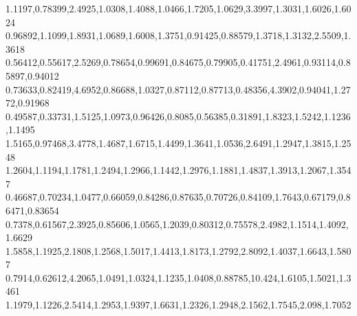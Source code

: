 1.1197,0.78399,2.4925,1.0308,1.4088,1.0466,1.7205,1.0629,3.3997,1.3031,1.6026,1.6024
0.96892,1.1099,1.8931,1.0689,1.6008,1.3751,0.91425,0.88579,1.3718,1.3132,2.5509,1.3618
0.56412,0.55617,2.5269,0.78654,0.99691,0.84675,0.79905,0.41751,2.4961,0.93114,0.85897,0.94012
0.73633,0.82419,4.6952,0.86688,1.0327,0.87112,0.87713,0.48356,4.3902,0.94041,1.2772,0.91968
0.49587,0.33731,1.5125,1.0973,0.96426,0.8085,0.56385,0.31891,1.8323,1.5242,1.1236,1.1495
1.5165,0.97468,3.4778,1.4687,1.6715,1.4499,1.3641,1.0536,2.6491,1.2947,1.3815,1.2548
1.2604,1.1194,1.1781,1.2494,1.2966,1.1442,1.2976,1.1881,1.4837,1.3913,1.2067,1.3547
0.46687,0.70234,1.0477,0.66059,0.84286,0.87635,0.70726,0.84109,1.7643,0.67179,0.86471,0.83654
0.7378,0.61567,2.3925,0.85606,1.0565,1.2039,0.80312,0.75578,2.4982,1.1514,1.4092,1.6629
1.5858,1.1925,2.1808,1.2568,1.5017,1.4413,1.8173,1.2792,2.8092,1.4037,1.6643,1.5807
0.7914,0.62612,4.2065,1.0491,1.0324,1.1235,1.0408,0.88785,10.424,1.6105,1.5021,1.3461
1.1979,1.1226,2.5414,1.2953,1.9397,1.6631,1.2326,1.2948,2.1562,1.7545,2.098,1.7052
